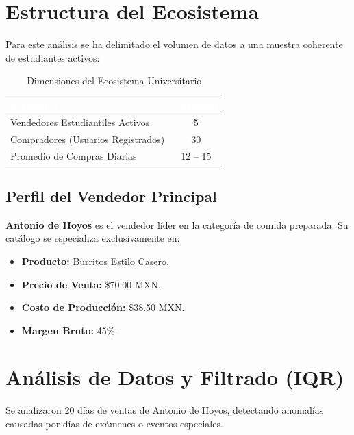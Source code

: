 \documentclass[12pt, a4paper]{article}
\begin{document}
\section{Estructura del Ecosistema}

Para este análisis se ha delimitado el volumen de datos a una muestra coherente de estudiantes activos:

\begin{table}[H]
\centering
\caption{Dimensiones del Ecosistema Universitario}
\begin{tabular}{l c}
\toprule
\rowcolor{tableheader}
\textcolor{white}{\textbf{Segmento}} & \textcolor{white}{\textbf{Cantidad}} \\
\midrule
Vendedores Estudiantiles Activos & 5 \\
\rowcolor{lightgray}
Compradores (Usuarios Registrados) & 30 \\
Promedio de Compras Diarias & 12 -- 15 \\
\bottomrule
\end{tabular}
\end{table}

\subsection{Perfil del Vendedor Principal}
\textbf{Antonio de Hoyos} es el vendedor líder en la categoría de comida preparada. Su catálogo se especializa exclusivamente en:
\begin{itemize}
    \item \textbf{Producto:} Burritos Estilo Casero.
    \item \textbf{Precio de Venta:} \$70.00 MXN.
    \item \textbf{Costo de Producción:} \$38.50 MXN.
    \item \textbf{Margen Bruto:} 45\%.
\end{itemize}

\section{Análisis de Datos y Filtrado (IQR)}

Se analizaron 20 días de ventas de Antonio de Hoyos, detectando anomalías causadas por días de exámenes o eventos especiales.
\end{document}
